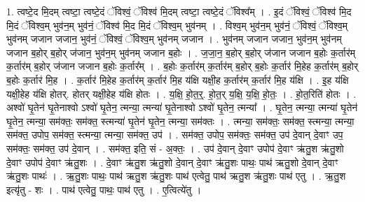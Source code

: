 \documentclass[17pt]{extarticle}
\begin{document}
1. त्वष्टे॒द मि॒दम् त्वष्टा॒ त्वष्टे॒दं ॅविश्वं॒ ॅविश्व॑ मि॒दम् त्वष्टा॒ त्वष्टे॒दं ॅविश्व᳚म् । . इ॒दं ॅविश्वं॒ ॅविश्व॑ मि॒द मि॒दं ॅविश्व॒म् भुव॑न॒म् भुव॑नं॒ ॅविश्व॑ मि॒द मि॒दं ॅविश्व॒म् भुव॑नम् । . विश्व॒म् भुव॑न॒म् भुव॑नं॒ ॅविश्वं॒ ॅविश्व॒म् भुव॑नम् जजान जजान॒ भुव॑नं॒ ॅविश्वं॒ ॅविश्व॒म् भुव॑नम् जजान । . भुव॑नम् जजान जजान॒ भुव॑न॒म् भुव॑नम् जजान ब॒होर् ब॒होर् ज॑जान॒ भुव॑न॒म् भुव॑नम् जजान ब॒होः । . ज॒जा॒न॒ ब॒होर् ब॒होर् ज॑जान जजान ब॒होः क॒र्तार॑म् क॒र्तार॑म् ब॒होर् ज॑जान जजान ब॒होः क॒र्तार᳚म् । . ब॒होः क॒र्तार॑म् क॒र्तार॑म् ब॒होर् ब॒होः क॒र्तार॑ मि॒हेह क॒र्तार॑म् ब॒होर् ब॒होः क॒र्तार॑ मि॒ह । . क॒र्तार॑ मि॒हेह क॒र्तार॑म् क॒र्तार॑ मि॒ह य॑क्षि यक्षी॒ह क॒र्तार॑म् क॒र्तार॑ मि॒ह य॑क्षि । . इ॒ह य॑क्षि यक्षी॒हेह य॑क्षि होतर्. होतर् यक्षी॒हेह य॑क्षि होतः । . य॒क्षि॒ हो॒त॒र्॒. हो॒त॒र् य॒क्षि॒ य॒क्षि॒ हो॒तः॒ । . हो॒त॒रिति॑ होतः । . अश्वो॑ घृ॒तेन॑ घृ॒तेनाश्वो ऽश्वो॑ घृ॒तेन॒ त्मन्या॒ त्मन्या॑ घृ॒तेनाश्वो ऽश्वो॑ घृ॒तेन॒ त्मन्या᳚ । . घृ॒तेन॒ त्मन्या॒ त्मन्या॑ घृ॒तेन॑ घृ॒तेन॒ त्मन्या॒ सम॑क्तः॒ सम॑क्त॒ स्त्मन्या॑ घृ॒तेन॑ घृ॒तेन॒ त्मन्या॒ सम॑क्तः । . त्मन्या॒ सम॑क्तः॒ सम॑क्त॒ स्त्मन्या॒ त्मन्या॒ सम॑क्त॒ उपोप॒ सम॑क्त॒ स्त्मन्या॒ त्मन्या॒ सम॑क्त॒ उप॑ । . सम॑क्त॒ उपोप॒ सम॑क्तः॒ सम॑क्त॒ उप॑ दे॒वान् दे॒वाꣳ उप॒ सम॑क्तः॒ सम॑क्त॒ उप॑ दे॒वान् । . सम॑क्त॒ इति॒ सं - अ॒क्तः॒ । . उप॑ दे॒वान् दे॒वाꣳ उपोप॑ दे॒वाꣳ ऋ॑तु॒श ऋ॑तु॒शो दे॒वाꣳ उपोप॑ दे॒वाꣳ ऋ॑तु॒शः । . दे॒वाꣳ ऋ॑तु॒श ऋ॑तु॒शो दे॒वान् दे॒वाꣳ ऋ॑तु॒शः पाथः॒ पाथ॑ ऋतु॒शो दे॒वान् दे॒वाꣳ ऋ॑तु॒शः पाथः॑ । . ऋ॒तु॒शः पाथः॒ पाथ॑ ऋतु॒श ऋ॑तु॒शः पाथ॑ एत्वेतु॒ पाथ॑ ऋतु॒श ऋ॑तु॒शः पाथ॑ एतु । . ऋ॒तु॒श इत्यृ॑तु - शः । . पाथ॑ एत्वेतु॒ पाथः॒ पाथ॑ एतु । . ए॒त्वित्ये॑तु । \newline
\end{document}
